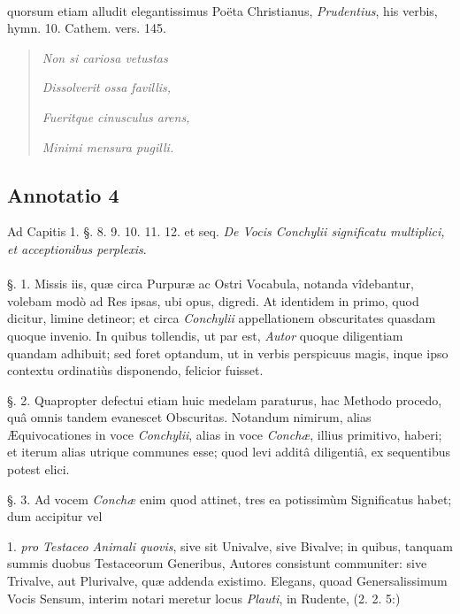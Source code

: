 \documentclass[a4paper, 11pt, oneside, polutonikogreek, german]{article}
\begin{document}
\paragraph{}
quorsum etiam alludit elegantissimus Poëta Christianus, \emph{Prudentius}, his verbis, hymn. 10. Cathem. vers. 145.
\begin{quotation}
\emph{Non si cariosa vetustas}

\emph{Dissolverit ossa favillis,}

\emph{Fueritque cinusculus arens,}

\emph{Minimi mensura pugilli.}
\end{quotation}
\paragraph{}
\subsection{Annotatio 4}
\begin{center}
Ad Capitis 1. §. 8. 9. 10. 11. 12. et seq. \emph{De Vocis Conchylii significatu multiplici, et acceptionibus perplexis}.
\end{center}
\paragraph{}
§. 1. Missis iis, quæ circa Purpuræ ac Ostri Vocabula, notanda vîdebantur, volebam modò ad Res ipsas, ubi opus, digredi. At identidem in primo, quod dicitur, limine detineor; et circa \emph{Conchylii} appellationem obscuritates quasdam quoque invenio. In quibus tollendis, ut par est, \emph{Autor} quoque diligentiam quandam adhibuit; sed foret optandum, ut in verbis perspicuus magis, inque ipso contextu ordinatiùs disponendo, felicior fuisset.

§. 2. Quapropter defectui etiam huic medelam paraturus, hac Methodo procedo, quâ omnis tandem evanescet Obscuritas. Notandum nimirum, alias Æquivocationes in voce \emph{Conchylii}, alias in voce \emph{Conchæ}, illius primitivo, haberi; et iterum alias utrique communes esse; quod levi additâ diligentiâ, ex sequentibus potest elici.

§. 3. Ad vocem \emph{Conchæ} enim quod attinet, tres ea potissimùm Significatus habet; dum accipitur vel

1. \emph{pro Testaceo Animali quovis}, sive sit Univalve, sive Bivalve; in quibus, tanquam summis duobus Testaceorum Generibus, Autores consistunt communiter: sive Trivalve, aut Plurivalve, quæ addenda existimo. Elegans, quoad Genersalissimum Vocis Sensum, interim notari meretur locus \emph{Plauti}, in Rudente, (2. 2. 5:)
\end{document}
